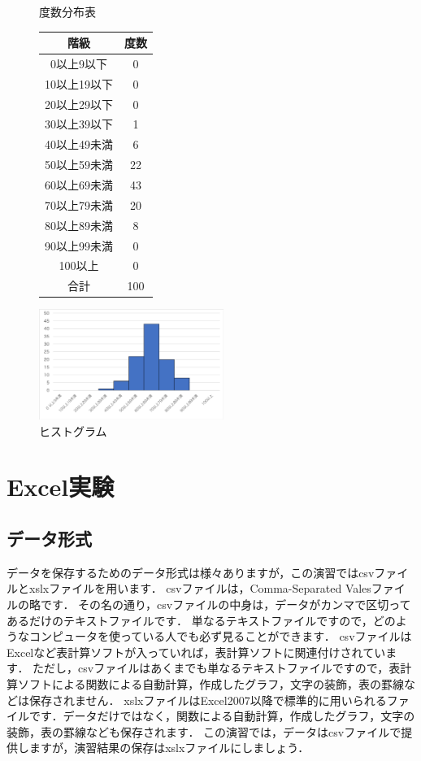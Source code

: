 \begin{figure}[tb]
    \begin{minipage}{0.5\hsize}
    \centering
    \caption{度数分布表}
    \begin{tabular}{c|c}
     階級          & 度数 \\ \hline
     0以上9以下   & 0 \\
     10以上19以下  & 0 \\
     20以上29以下  & 0 \\
     30以上39以下  & 1 \\
     40以上49未満  & 6 \\
     50以上59未満  & 22\\
     60以上69未満  & 43\\
     70以上79未満  & 20\\
     80以上89未満  & 8 \\
     90以上99未満  & 0 \\
     100以上       & 0 \\
     合計          & 100
    \end{tabular}
    \label{tab:hist}
    \end{minipage}
    \begin{minipage}{0.5\hsize}
    \centering
    \includegraphics[width=6cm]{chap1/hist.png}
    \makeatletter
    \def\@captype{figure}
    \makeatother
    \caption{ヒストグラム}
  \label{fig:histogram}
\end{minipage}
\end{figure}

\clearpage

\section{Excel実験}

\subsection{データ形式}

データを保存するためのデータ形式は様々ありますが，この演習ではcsvファイルとxslxファイルを用います．
csvファイルは，Comma-Separated Valesファイルの略です．
その名の通り，csvファイルの中身は，データがカンマで区切ってあるだけのテキストファイルです．
単なるテキストファイルですので，どのようなコンピュータを使っている人でも必ず見ることができます．
csvファイルはExcelなど表計算ソフトが入っていれば，表計算ソフトに関連付けされています．
ただし，csvファイルはあくまでも単なるテキストファイルですので，表計算ソフトによる関数による自動計算，作成したグラフ，文字の装飾，表の罫線などは保存されません．
xslxファイルはExcel2007以降で標準的に用いられるファイルです．データだけではなく，関数による自動計算，作成したグラフ，文字の装飾，表の罫線なども保存されます．
この演習では，データはcsvファイルで提供しますが，演習結果の保存はxslxファイルにしましょう．

